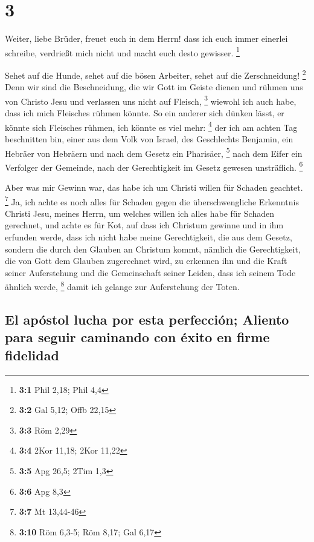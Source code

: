\hypertarget{section-2}{%
\section{3}\label{section-2}}

 Weiter, liebe Brüder, freuet euch in dem Herrn! dass ich
euch immer einerlei schreibe, verdrießt mich nicht und macht euch desto
gewisser. \footnote{\textbf{3:1} Phil 2,18; Phil 4,4}

 Sehet auf die Hunde, sehet auf die bösen Arbeiter, sehet
auf die Zerschneidung! \footnote{\textbf{3:2} Gal 5,12; Offb 22,15}
 Denn wir sind die Beschneidung, die wir Gott im Geiste
dienen und rühmen uns von Christo Jesu und verlassen uns nicht auf
Fleisch, \footnote{\textbf{3:3} Röm 2,29}  wiewohl ich
auch habe, dass ich mich Fleisches rühmen könnte. So ein anderer sich
dünken lässt, er könnte sich Fleisches rühmen, ich könnte es viel mehr:
\footnote{\textbf{3:4} 2Kor 11,18; 2Kor 11,22}  der ich am
achten Tag beschnitten bin, einer aus dem Volk von Israel, des
Geschlechts Benjamin, ein Hebräer von Hebräern und nach dem Gesetz ein
Pharisäer, \footnote{\textbf{3:5} Apg 26,5; 2Tim 1,3} 
nach dem Eifer ein Verfolger der Gemeinde, nach der Gerechtigkeit im
Gesetz gewesen unsträflich. \footnote{\textbf{3:6} Apg 8,3}

 Aber was mir Gewinn war, das habe ich um Christi willen
für Schaden geachtet. \footnote{\textbf{3:7} Mt 13,44-46} 
Ja, ich achte es noch alles für Schaden gegen die überschwengliche
Erkenntnis Christi Jesu, meines Herrn, um welches willen ich alles habe
für Schaden gerechnet, und achte es für Kot, auf dass ich Christum
gewinne  und in ihm erfunden werde, dass ich nicht habe
meine Gerechtigkeit, die aus dem Gesetz, sondern die durch den Glauben
an Christum kommt, nämlich die Gerechtigkeit, die von Gott dem Glauben
zugerechnet wird,  zu erkennen ihn und die Kraft seiner
Auferstehung und die Gemeinschaft seiner Leiden, dass ich seinem Tode
ähnlich werde, \footnote{\textbf{3:10} Röm 6,3-5; Röm 8,17; Gal 6,17}
 damit ich gelange zur Auferstehung der Toten.

\hypertarget{el-apuxf3stol-lucha-por-esta-perfecciuxf3n-aliento-para-seguir-caminando-con-uxe9xito-en-firme-fidelidad}{%
\subsection{El apóstol lucha por esta perfección; Aliento para seguir
caminando con éxito en firme
fidelidad}\label{el-apuxf3stol-lucha-por-esta-perfecciuxf3n-aliento-para-seguir-caminando-con-uxe9xito-en-firme-fidelidad}}

